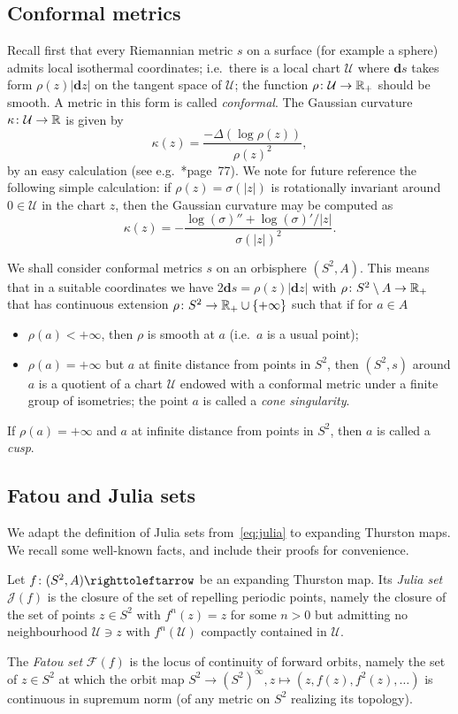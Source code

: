 \documentclass{amsart}
\newcommand\dd{\mathbf{d}}
\newcommand\Fatou{{\mathcal F}}
\newcommand\Julia{{\mathcal J}}
\begin{document}
\subsection{Conformal metrics}
Recall first that every Riemannian metric $s$ on a surface (for
example a sphere) admits local isothermal coordinates; i.e.\ there is
a local chart $\mathcal U$ where $\dd s$ takes form $\rho(z)|\dd z|$
on the tangent space of $\mathcal U$; the function
$\rho\colon \mathcal U\to{\mathbb R}_+$ should be smooth. A metric in this form
is called \emph{conformal}. The Gaussian curvature
$\kappa\colon \mathcal U \to{\mathbb R}$ is given by
\[\kappa(z)=\frac{-\Delta(\log\rho(z))}{\rho(z)^2},
\]
by an easy calculation (see
e.g.~\cite{griffiths-harris:pag}*{page~77}). We
note for future reference the following simple calculation: if
$\rho(z)=\sigma(|z|)$ is rotationally invariant around $0\in  \mathcal U$
in the chart $z$, then
the Gaussian curvature may be computed as
\begin{equation}\label{eq:polarkappa}
  \kappa(z)=-\frac{\log(\sigma)''+\log(\sigma)'/|z|}{\sigma(|z|)^2}.
\end{equation}
 

We shall consider conformal metrics $s$ on an orbisphere
$(S^2,A)$. This means that in a suitable coordinates we have
2$\dd s=\rho(z)|\dd z|$ with $\rho\colon S^2\setminus A\to {\mathbb R}_{+}$
that has continuous extension
$\rho\colon S^2\to {\mathbb R}_{+}\cup \{+\infty\}$ such that if for $a\in A$

\begin{itemize}
\item $\rho(a)<+\infty$, then $\rho$ is smooth at $a$ (i.e.~$a$ is a
  usual point);
\item $\rho(a)=+\infty$ but $a$ at finite distance from points in
  $S^2$, then $(S^2,s)$ around $a$ is a quotient of a chart
  $\mathcal U$ endowed with a conformal metric under a finite group of
  isometries; the point $a$ is called a \emph{cone singularity}.
\end{itemize}
If $\rho(a)=+\infty$ and $a$ at infinite distance from points in
$S^2$, then $a$ is called a \emph{cusp}.

\subsection{Fatou and Julia sets}\label{ss:fatou}
We adapt the definition of Julia sets from~\eqref{eq:julia} to
expanding Thurston maps. We recall some well-known facts, and include
their proofs for convenience.
\begin{defn}
  Let $f\colon(S^2,A)\selfmap$ be an expanding Thurston map. Its \emph{Julia
    set} $\Julia(f)$ is the closure of the set of repelling
  periodic points, namely the closure of the set of points $z\in S^2$
  with $f^n(z)=z$ for some $n>0$ but admitting no neighbourhood
  $\mathcal U\ni z$ with $f^n(\mathcal U)$ compactly contained in
  $\mathcal U$.

  The \emph{Fatou set} $\Fatou(f)$ is the locus of continuity of
  forward orbits, namely the set of $z\in S^2$ at which the orbit map
  $S^2\to (S^2)^\infty,z\mapsto(z,f(z),f^2(z),\dots)$ is continuous in
  supremum norm (of any metric on $S^2$ realizing its topology).
\end{defn}
\end{document}
